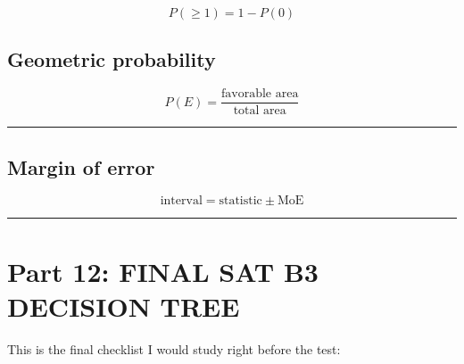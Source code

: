 \documentclass[
]{article}
\begin{document}
\[
\boxed{
P(\ge1)=1-P(0)
}
\]

\subsection{Geometric probability}\label{geometric-probability-1}

\[
\boxed{
P(E)=
\frac{\text{favorable area}}
{\text{total area}}
}
\]

\begin{center}\rule{0.5\linewidth}{0.5pt}\end{center}

\subsection{Margin of error}\label{margin-of-error-1}

\[
\boxed{
\text{interval}
=
\text{statistic}\pm\text{MoE}
}
\]

\begin{center}\rule{0.5\linewidth}{0.5pt}\end{center}

\section{Part 12: FINAL SAT B3 DECISION
TREE}\label{part-12-final-sat-b3-decision-tree}

This is the final checklist I would study right before the test:
\end{document}
